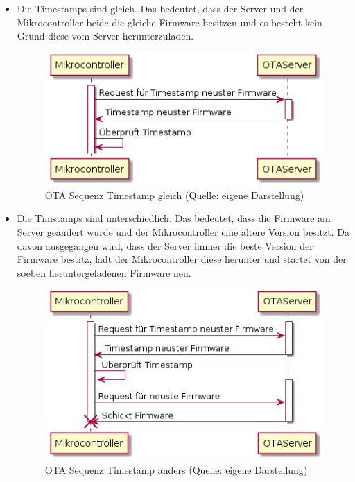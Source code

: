\begin{itemize}
    \item Die Timestamps sind gleich. Das bedeutet, dass der Server und der Mikrocontroller beide die gleiche Firmware besitzen und es besteht kein Grund diese vom Server herunterzuladen.
    \begin{figure}[H]
        \begin{center}
            \includegraphics[scale=0.8]{diagrams/ota_sequence_same_timestamp.png}
            \caption{OTA Sequenz Timestamp gleich (Quelle: eigene Darstellung)}
        \end{center}
    \end{figure}
    \newpage
    \item Die Timstamps sind unterschiedlich. Das bedeutet, dass die Firmware am Server geändert wurde und der Mikrocontroller eine ältere Version besitzt.\newline
    Da davon ausgegangen wird, dass der Server immer die beste Version der Firmware bestitz, lädt der Mikrocontroller diese herunter und startet von der soeben heruntergeladenen Firmware neu.
    \begin{figure}[H]
        \begin{center}
            \includegraphics[scale=0.8]{diagrams/ota_sequence_different_timestamp.png}
            \caption{OTA Sequenz Timestamp anders (Quelle: eigene Darstellung)}
        \end{center}
    \end{figure}
\end{itemize}

